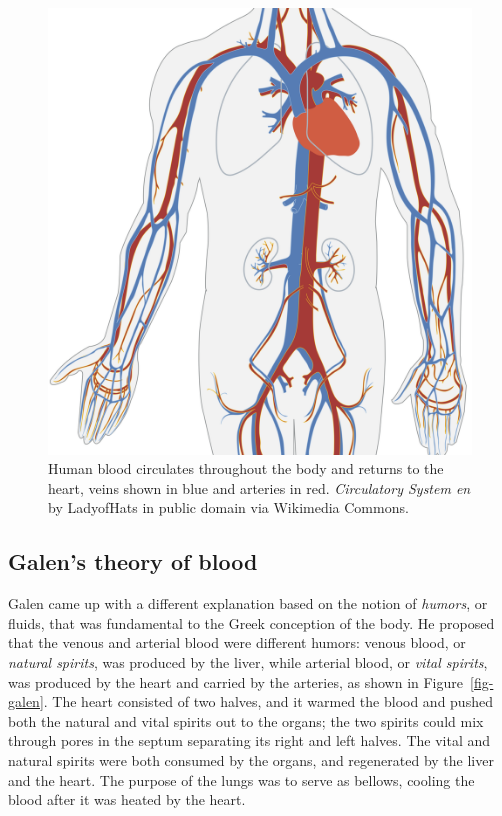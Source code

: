 \documentclass[
  letterpaper,
  DIV=11,
  numbers=noendperiod]{scrreprt}
\begin{document}
\begin{figure}

{\centering \includegraphics{./ch1/Circulatory_System_no_tags_cropped.png}

}

\caption{\label{fig-blood-circ}Human blood circulates throughout the
body and returns to the heart, veins shown in blue and arteries in red.
\emph{Circulatory System en} by LadyofHats in public domain via
Wikimedia Commons.}

\end{figure}

\hypertarget{galens-theory-of-blood}{%
\subsection{Galen's theory of blood}\label{galens-theory-of-blood}}

Galen came up with a different explanation based on the notion of
\emph{humors}, or fluids, that was fundamental to the Greek conception
of the body. He proposed that the venous and arterial blood were
different humors: venous blood, or \emph{natural spirits}, was produced
by the liver, while arterial blood, or \emph{vital spirits}, was
produced by the heart and carried by the arteries, as shown in
Figure~\ref{fig-galen}. The heart consisted of two halves, and it warmed
the blood and pushed both the natural and vital spirits out to the
organs; the two spirits could mix through pores in the septum separating
its right and left halves. The vital and natural spirits were both
consumed by the organs, and regenerated by the liver and the heart. The
purpose of the lungs was to serve as bellows, cooling the blood after it
was heated by the heart.
\end{document}
